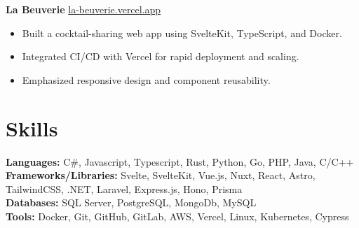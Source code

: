 \documentclass[11pt]{article}       %
\begin{document}
\textbf{La Beuverie} \hfill \href{https://la-beuverie.vercel.app}{la-beuverie.vercel.app} \\
\vspace{-9pt}
\begin{itemize}
	\item Built a cocktail-sharing web app using SvelteKit, TypeScript, and Docker.
	\item Integrated CI/CD with Vercel for rapid deployment and scaling.
  \item Emphasized responsive design and component reusability.
\end{itemize}

\vspace{-18.5pt}

\section*{Skills}
\textbf{Languages:} C\#, Javascript, Typescript, Rust, Python, Go, PHP, Java, C/C++ \\
\textbf{Frameworks/Libraries:}  Svelte, SvelteKit, Vue.js, Nuxt, React, Astro, TailwindCSS, .NET, Laravel, Express.js, Hono, Prisma \\
\textbf{Databases:} SQL Server, PostgreSQL, MongoDb, MySQL \\
\textbf{Tools:} Docker, Git, GitHub, GitLab, AWS, Vercel, Linux, Kubernetes, Cypress
\end{document}
